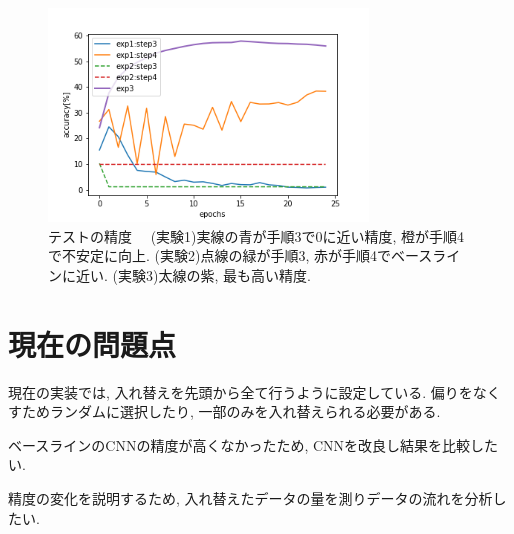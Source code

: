 \documentclass[twocolumn]{jarticle}     %
\begin{document}

	\begin{figure}[tb]
		\begin{center}
			\includegraphics[clip,width=8.5cm]{accuracy.png}
			\caption{テストの精度　
			(実験1)実線の青が手順3で0に近い精度, 橙が手順4で不安定に向上.
			(実験2)点線の緑が手順3, 赤が手順4でベースラインに近い.
			(実験3)太線の紫, 最も高い精度.}
			\label{fig:accuracy}
		\end{center}
	\end{figure}



\section{現在の問題点}
現在の実装では, 入れ替えを先頭から全て行うように設定している. 偏りをなくすためランダムに選択したり, 一部のみを入れ替えられる必要がある.

ベースラインのCNNの精度が高くなかったため, CNNを改良し結果を比較したい.

精度の変化を説明するため, 入れ替えたデータの量を測りデータの流れを分析したい.
\end{document}
